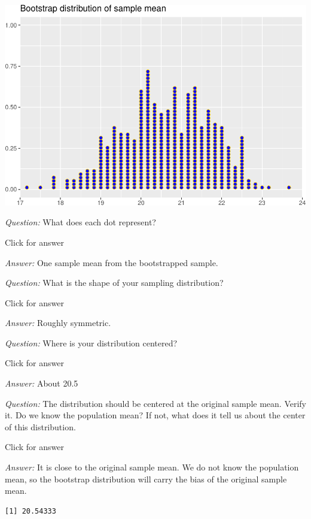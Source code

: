 \documentclass[
]{book}
\newenvironment{Shaded}{\begin{snugshade}}{\end{snugshade}}
\newcommand{\CommentTok}[1]{\textcolor[rgb]{0.56,0.35,0.01}{\textit{#1}}}
\newcommand{\FunctionTok}[1]{\textcolor[rgb]{0.00,0.00,0.00}{#1}}
\newcommand{\NormalTok}[1]{#1}
\newcommand{\SpecialCharTok}[1]{\textcolor[rgb]{0.00,0.00,0.00}{#1}}
\begin{document}
\includegraphics[width=1\linewidth]{Class_Activity_7_files/figure-latex/unnamed-chunk-4-1}

\emph{Question:} What does each dot represent?

Click for answer

\emph{Answer:} One sample mean from the bootstrapped sample.

\emph{Question:} What is the shape of your sampling distribution?

Click for answer

\emph{Answer:} Roughly symmetric.

\emph{Question:} Where is your distribution centered?

Click for answer

\emph{Answer:} About 20.5

\emph{Question:} The distribution should be centered at the original sample mean. Verify it. Do we know the population mean? If not, what does it tell us about the center of this distribution.

Click for answer

\emph{Answer:} It is close to the original sample mean. We do not know the population mean, so the bootstrap distribution will carry the bias of the original sample mean.

\begin{Shaded}
\end{Shaded}

\begin{verbatim}
[1] 20.54333
\end{verbatim}
\end{document}
